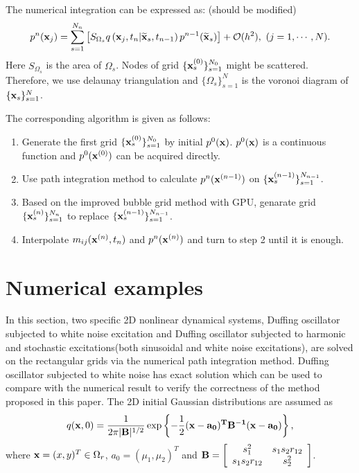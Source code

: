 \documentclass[a4paper, 11pt, final]{article}
\begin{document}
The numerical integration can be expressed as: (should be modified)
\begin{equation}\label{mpi1}
    p^{n}({\bf
    x}_j)=\sum\limits_{s=1}^{N_n}\left[S_{\Omega_s}q\left({\bf
    x}_j,t_n|{\bf \widetilde{x}}_{s},t_{n-1}\right)p^{n-1}({\bf
    \widetilde{x}}_{s})\right]+\mathcal{O}(h^2),\ (j=1,\cdots,N).
\end{equation}
Here $S_{\Omega_s}$ is the area of $\Omega_s$. Nodes of grid  $\{{\bf x}_s^{(0)}\}_{s=1}^{N_0}$ 
might be scattered.
Therefore, we use delaunay triangulation and  $\{\Omega_s\}_{s=1}^{N}$ is the voronoi diagram of
$\{{\bf x}_s\}_{s=1}^{N}$.

The corresponding algorithm is given as follows:
\begin{enumerate}
    \item Generate the first grid  $\{{\bf x}_s^{(0)}\}_{s=1}^{N_0}$ by initial $p^{0}({{\bf x}})$. 
    $p^{0}({{\bf x}})$ is a continuous function and $p^{0}({\bf x}^{(0)})$ can be acquired directly.
    \item Use path integration method to calculate $p^{n}({\bf x}^{(n-1)})$ on $\{{\bf x}_s^{(n-1)}\}_{s=1}^{N_{n-1}}$.
    \item Based on the improved bubble grid method with GPU, genarate grid $\{{\bf x}_s^{(n)}\}_{s=1}^{N_{n}}$ to replace $\{{\bf x}_s^{(n-1)}\}_{s=1}^{N_{n-1}}$.
    \item Interpolate $m_{ij}({{\bf x}^{(n)},t_n})$ and $p^{n}({\bf x}^{(n)})$ and turn to step 2 until it is enough. 
\end{enumerate}

\section{Numerical examples}
In this section, two specific 2D nonlinear dynamical systems, 
Duffing oscillator subjected to white noise excitation and
Duffing oscillator subjected to harmonic and stochastic
excitations(both sinusoidal and white noise excitations),
are solved on the rectangular grids via the numerical path
integration method. Duffing oscillator subjected to white
noise has exact solution which can be used to compare with
the numerical result to verify the correctness of the method
proposed in this paper. The 2D initial Gaussian distributions
are assumed as
\begin{equation}
    \label{IG2}
    q({\bf x},0)=\frac{1}{2\pi|{\bf
    B}|^{1/2}}\exp\left\{-\frac{1}{2}(\bf x-a_0)^T{\bf B}^{-1}(\bf
    x-a_0)\right\},
\end{equation}
where ${\bf x}=(x,y)^T\in\Omega_r$, $a_0=(\mu_1,\mu_2)^T$ and
${\bf B}=\left[
\begin{array}{cc}
s_1^2&s_1s_2r_{12}\\
s_1s_2r_{12}&s_2^2\\
\end{array}\right]$.
\end{document}
